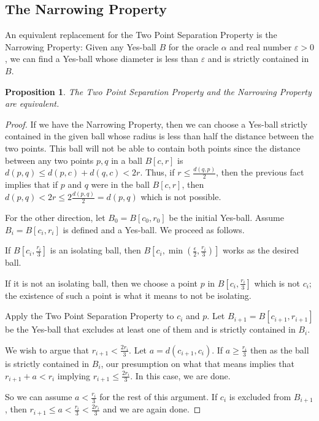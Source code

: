 \documentclass[12pt]{article}
\newtheorem{proposition}{Proposition}[section]
\begin{document}
\subsection{The Narrowing Property}

An equivalent replacement for the Two Point Separation Property is the Narrowing Property: Given any Yes-ball $B$ for the oracle $\alpha$ and real number $\varepsilon >0$, we can find a Yes-ball whose diameter is less than $\varepsilon$ and is strictly contained in $B$.

\begin{proposition}
    The Two Point Separation Property and the Narrowing Property are equivalent.
\end{proposition}

\begin{proof}

If we have the Narrowing Property, then we can choose a Yes-ball strictly contained in the given ball whose radius is less than half the distance between the two points. This ball will not be able to contain both points since the distance between any two points $p, q$ in a ball $B[c, r]$ is $d(p,q) \leq d(p, c) + d(q,c) < 2r$. Thus, if $ r \leq \frac{d(q,p)}{2}$, then the previous fact implies that if $p$ and $q$ were in the ball $B[c, r]$, then $d(p,q) < 2 r \leq 2\frac{d(p,q)}{2} = d(p,q)$ which is not possible. 

For the other direction, let $B_0 = B[c_0, r_0]$ be the initial Yes-ball. Assume $B_i = B[c_i, r_i]$ is defined and a Yes-ball. We proceed as follows. 

If $B[c_i, \frac{r_i}{3}]$ is an isolating ball, then $B[c_i, \min(\frac{\epsilon}{2}, \frac{r_i}{3})]$ works as the desired ball. 

If it is not an isolating ball, then we choose a point $p$ in $B[c_i, \frac{r_i}{3}]$ which is not $c_i$; the existence of such a point is what it means to not be isolating.

Apply the Two Point Separation Property to $c_i$ and $p$. Let $B_{i+1} = B[c_{i+1}, r_{i+1}]$  be the Yes-ball that excludes at least one of them and is strictly contained in $B_i$.

We wish to argue that $r_{i +1} < \frac{2r_i}{3}$. Let $a = d(c_{i+1}, c_i)$. If $a \geq \frac{r_i}{3}$ then as the ball is
strictly contained in $B_i$, our presumption on what that means implies that $r_{i+1} + a < r_i$ implying $ r_{i+1} \leq \frac{2 r_i}{3}$. In this case, we are done. 

So we can assume $a < \frac{r_i}{3}$ for the rest of this argument. If $c_i$ is excluded from $B_{i+1}$, then $r_{i+1} \leq a < \frac{r_i}{3} < \frac{2 r_i}{3}$ and we are again done.


\end{proof}
\end{document}
